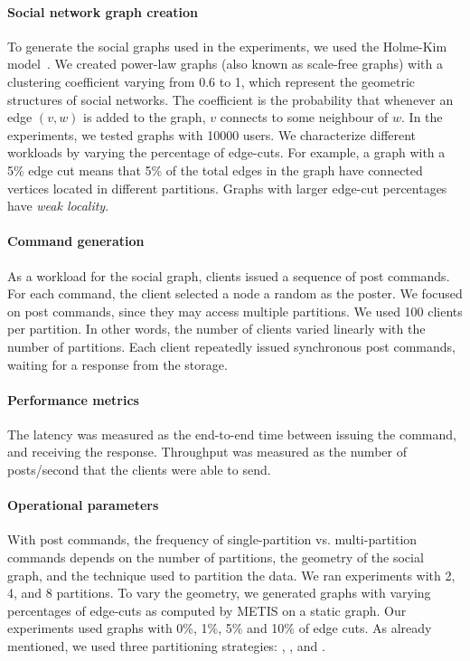 \paragraph*{Social network graph creation}
%
To generate the social graphs used in the experiments, we used the
Holme-Kim model~\cite{holme-kim}.  We created power-law graphs (also
known as scale-free graphs) with a clustering coefficient varying from
0.6 to 1, which represent the geometric structures of social
networks. The coefficient is the probability that whenever an edge
$(v, w)$ is added to the graph, $v$ connects to some neighbour of $w$.
In the experiments, we tested graphs with 10000 users. We characterize
different workloads by varying the percentage of edge-cuts.  For
example, a graph with a 5\% edge cut means that 5\% of the total edges
in the graph have connected vertices located in different partitions.
Graphs with larger edge-cut percentages have \emph{weak locality}.

\paragraph*{Command generation}
%
As a workload for the social graph, clients issued a sequence of post
commands.  For each command, the client selected a node a random as
the poster.  We focused on post commands, since they may access
multiple partitions.  We used 100 clients per partition. In other
words, the number of clients varied linearly with the number of
partitions.  Each client repeatedly issued synchronous post commands,
waiting for a response from the storage.

\paragraph*{Performance metrics}
%
The latency was measured as the end-to-end time between issuing the
command, and receiving the response.  Throughput was measured as the
number of posts/second that the clients were able to send.

\paragraph*{Operational parameters}
%
With post commands, the frequency of single-partition
vs. multi-partition commands depends on the number of partitions, the
geometry of the social graph, and the technique used to partition the
data. We ran experiments with 2, 4, and 8 partitions.  To vary the
geometry, we generated graphs with varying percentages of edge-cuts as
computed by METIS on a static graph. Our experiments used graphs with
0\%, 1\%, 5\% and 10\% of edge cuts. As already mentioned, we used
three partitioning strategies: \ssmr{}, \dssmr, and \dynastar.


